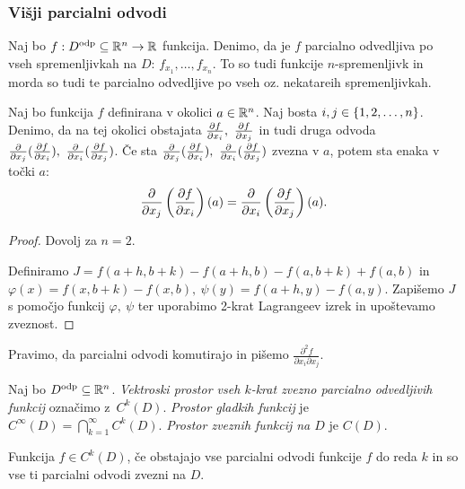 \subsubsection{Višji parcialni odvodi}
Naj bo $f: D^{\text{odp}} \subseteq \mathbb{R}^n \to \mathbb{R}$ funkcija. Denimo, da je $f$ parcialno odvedljiva po vseh spremenljivkah na $D$: $f_{x_1}, \ldots, f_{x_n}$. To so tudi funkcije $n$-spremenljivk in morda so tudi te parcialno odvedljive po vseh oz. nekatareih spremenljivkah.

\begin{trditev}
    Naj bo funkcija $f$ definirana v okolici $a \in \mathbb{R}^n$. Naj bosta $i, j \in \left\{1, 2, \ldots, n\right\}$. Denimo, da na tej okolici obstajata $\frac{\partial f}{\partial x_i}, \ \frac{\partial f}{\partial x_j}$ in tudi druga odvoda $\frac{\partial}{\partial x_j} (\podv{f}{x_i}), \ \frac{\partial}{\partial x_i} (\podv{f}{x_j})$. Če sta $\frac{\partial}{\partial x_j} (\podv{f}{x_i}), \ \frac{\partial}{\partial x_i} (\podv{f}{x_j})$ zvezna v $a$, potem sta enaka v točki $a$: 
    $$\frac{\partial}{\partial x_j} \left(\frac{\partial f}{\partial x_i}\right)(a) = \frac{\partial}{\partial x_i} \left(\frac{\partial f}{\partial x_j}\right)(a).$$
\end{trditev}

\begin{proof}
    Dovolj za $n=2$. 
    
    Definiramo $J = f(a+h, b+k) - f(a+h, b) - f(a, b+k) + f(a,b)$ in $\varphi(x) = f(x, b+k) - f(x, b), \ \psi(y) = f(a+h, y) - f(a, y)$. Zapišemo $J$ s pomočjo funkcij $\varphi, \ \psi$ ter uporabimo 2-krat Lagrangeev izrek in upoštevamo zveznost.
\end{proof}

\begin{opomba}
     Pravimo, da parcialni odvodi komutirajo in pišemo $\frac{\partial^2 f}{\partial x_i \partial x_j}$.
\end{opomba}

\begin{definicija}
    Naj bo $D^\text{odp} \subseteq \mathbb{R}^n$. \emph{Vektroski prostor vseh $k$-krat zvezno parcialno odvedljivih funkcij} označimo z~$C^k(D)$. \emph{Prostor gladkih funkcij} je $C^\infty(D) = \bigcap_{k=1}^\infty C^k(D)$. \emph{Prostor zveznih funkcij na $D$} je $C(D)$.
\end{definicija}

\begin{opomba}
    Funkcija $f \in C^k(D)$, če obstajajo vse parcialni odvodi funkcije $f$ do reda $k$ in so vse ti parcialni odvodi zvezni na $D$. 
\end{opomba}

